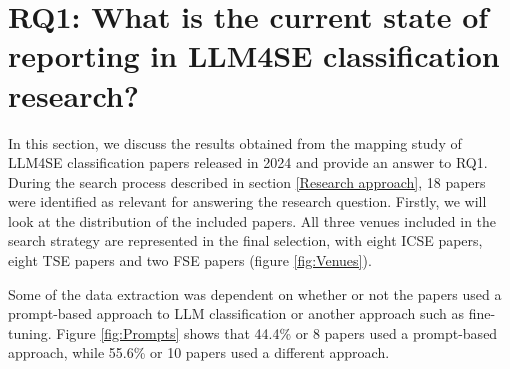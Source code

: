 \documentclass[a4paper]{article}
\begin{document}
\section{RQ1: What is the current state of reporting in LLM4SE classification research?}
In this section, we discuss the results obtained from the mapping study of LLM4SE classification papers released in 2024 and provide an answer to RQ1. During the search process described in section \ref{Research approach}, 18 papers were identified as relevant for answering the research question. Firstly, we will look at the distribution of the included papers. All three venues included in the search strategy are represented in the final selection, with eight ICSE papers, eight TSE papers and two FSE papers (figure \ref{fig:Venues}). 
	
Some of the data extraction was dependent on whether or not the papers used a prompt-based approach to LLM classification or another approach such as fine-tuning. Figure \ref{fig:Prompts} shows that 44.4\% or 8 papers used a prompt-based approach, while  55.6\% or 10 papers used a different approach.
\end{document}
